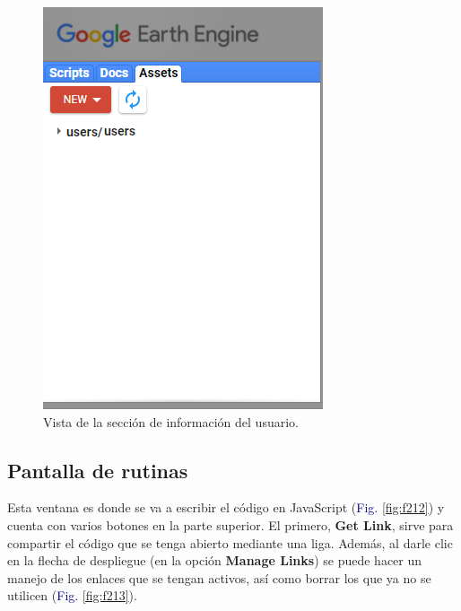 \documentclass[
  12pt,
  letterpaper,
  twoside]{book}
\begin{document}
\begin{figure}[H]

{\centering \includegraphics[width=0.6\linewidth]{Img/assets} 

}

\caption{Vista de la sección de información del usuario.}\label{fig:f211}
\end{figure}

\hypertarget{pantalla-de-rutinas}{%
\subsection*{Pantalla de rutinas}\label{pantalla-de-rutinas}}

Esta ventana es donde se va a escribir el código en JavaScript (\textcolor{darkblue}{Fig.} \ref{fig:f212}) y cuenta con varios botones en la parte superior. El primero, \textbf{Get Link}, sirve para compartir el código que se tenga abierto mediante una liga. Además, al darle clic en la flecha de despliegue (en la opción \textbf{Manage Links}) se puede hacer un manejo de los enlaces que se tengan activos, así como borrar los que ya no se utilicen (\textcolor{darkblue}{Fig.} \ref{fig:f213}).
\end{document}
